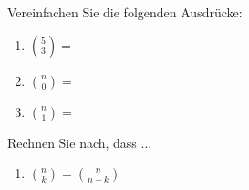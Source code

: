 \begin{ExerciseBlock}
Vereinfachen Sie die folgenden Ausdrücke:
\begin{enumerate}[label=\alph*)]
	\item $\displaystyle \binom{5}{3} = $
	\item $\displaystyle \binom{n}{0} = $
	\item $\displaystyle \binom{n}{1} = $
\end{enumerate}
\par\smallskip
Rechnen Sie nach, dass ...
\begin{enumerate}[label=\alph*),start=4]
	\item $\displaystyle \binom{n}{k} = \binom{n}{n-k}$
\end{enumerate}

\end{ExerciseBlock}
